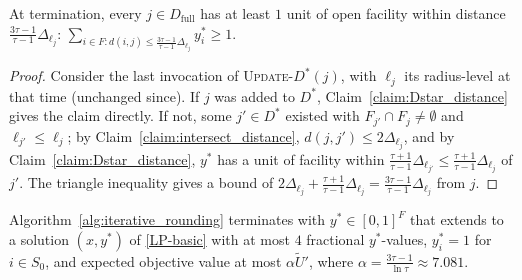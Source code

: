 \documentclass[a4paper,11pt]{article}
\begin{document}
\begin{lemma}
\label{lem:full_client_distance}
At termination, every $j\in D_\text{full}$ has at least $1$ unit of open
facility within distance $\frac{3\tau-1}{\tau-1}\Delta_{\ell_j}$: $\sum_{i
\in F: d(i,j)\le \frac{3\tau-1}{\tau-1}\Delta_{\ell_j}} y^*_i\ge1$.
\end{lemma}
\begin{proof}
Consider the last invocation of \textsc{Update-$D^*$}$(j)$, with $\ell_j$
its radius-level at that time (unchanged since). If $j$ was added to
$D^*$, Claim~\ref{claim:Dstar_distance} gives the claim directly. If not,
some $j'\in D^*$ existed with $F_{j'}\cap F_j\ne\emptyset$ and
$\ell_{j'}\le\ell_j$; by Claim~\ref{claim:intersect_distance},
$d(j,j')\le2\Delta_{\ell_j}$, and by Claim~\ref{claim:Dstar_distance},
$y^*$ has a unit of facility within $\frac{\tau+1}{\tau-1}\Delta_{\ell_{j'}}
\le\frac{\tau+1}{\tau-1}\Delta_{\ell_j}$ of $j'$. The triangle inequality
gives a bound of $2\Delta_{\ell_j}+\frac{\tau+1}{\tau-1}\Delta_{\ell_j}=
\frac{3\tau-1}{\tau-1}\Delta_{\ell_j}$ from $j$.
\end{proof}

\begin{theorem}
\label{thm:solution_iter}
Algorithm~\ref{alg:iterative_rounding} terminates with $y^*\in[0,1]^F$
that extends to a solution $(x,y^*)$ of \eqref{LP-basic} with at most $4$
fractional $y^*$-values, $y^*_i=1$ for $i\in S_0$, and expected objective
value at most $\alpha\tilde U'$, where $\alpha=\frac{3\tau-1}{\ln\tau}
\approx7.081$.
\end{theorem}
\end{document}
